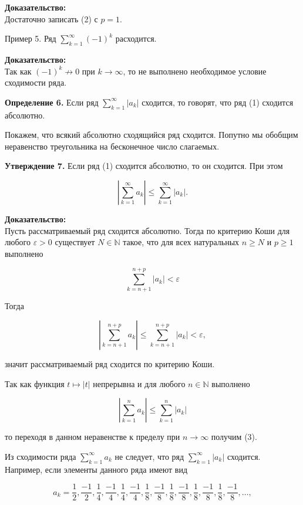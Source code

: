 \documentclass[a4paper,12pt]{article} %
\begin{document}
	\textbf{Доказательство:\\}
	Достаточно записать (2) с $p=1$.
	
	Пример 5. Ряд $\sum_{k=1}^{\infty}(-1)^{k}$ расходится.
	
	\textbf{Доказательство:\\}
	Так как $(-1)^{k} \not \rightarrow 0$ при $k \rightarrow \infty$, то не выполнено необходимое условие сходимости ряда.
	
	\textbf{Определение 6.} Если ряд $\sum_{k=1}^{\infty}\left|a_{k}\right|$ сходится, то говорят, что ряд (1) сходится абсолютно.
	
	Покажем, что всякий абсолютно сходящийся ряд сходится. Попутно мы обобщим неравенство треугольника на бесконечное число слагаемых.
	
	\textbf{Утверждение 7.} Если ряд (1) сходится абсолютно, то он сходится. При этом
	
	$$
	\left|\sum_{k=1}^{\infty} a_{k}\right| \leq \sum_{k=1}^{\infty}\left|a_{k}\right| .
	$$
	
	\textbf{Доказательство:\\}
	Пусть рассматриваемый ряд сходится абсолютно. Тогда по критерию Коши для любого $\varepsilon>0$ существует $N \in \mathbb{N}$ такое, что для всех натуральных $n \geq N$ и $p \geq 1$ выполнено
	
	$$
	\sum_{k=n+1}^{n+p}\left|a_{k}\right|<\varepsilon
	$$
	
	Тогда
	
	$$
	\left|\sum_{k=n+1}^{n+p} a_{k}\right| \leq \sum_{k=n+1}^{n+p}\left|a_{k}\right|<\varepsilon,
	$$
	
	значит рассматриваемый ряд сходится по критерию Коши.
	
	Так как функция $t \mapsto|t|$ непрерывна и для любого $n \in \mathbb{N}$ выполнено
	
	$$
	\left|\sum_{k=1}^{n} a_{k}\right| \leq \sum_{k=1}^{n}\left|a_{k}\right|
	$$
	
	то переходя в данном неравенстве к пределу при $n \rightarrow \infty$ получим (3).
	
	Из сходимости ряда $\sum_{k=1}^{\infty} a_{k}$ не следует, что ряд $\sum_{k=1}^{\infty}\left|a_{k}\right|$ сходится. Например, если элементы данного ряда имеют вид
	
	$$
	a_{k}=\frac{1}{2}, \frac{-1}{2}, \frac{1}{4}, \frac{-1}{4}, \frac{1}{4}, \frac{-1}{4}, \frac{1}{8}, \frac{-1}{8}, \frac{1}{8}, \frac{-1}{8}, \frac{1}{8}, \frac{-1}{8}, \frac{1}{8}, \frac{-1}{8}, \ldots,
	$$
	
\end{document}
